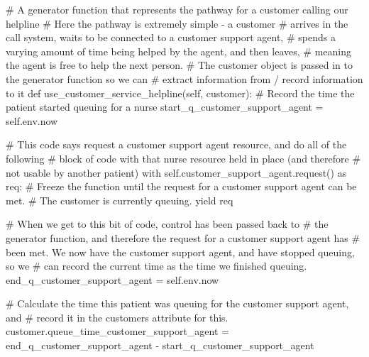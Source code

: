 \documentclass[
  letterpaper,
  DIV=11,
  numbers=noendperiod]{scrreprt}
\newenvironment{Shaded}{\begin{snugshade}}{\end{snugshade}}
\newcommand{\CommentTok}[1]{\textcolor[rgb]{0.37,0.37,0.37}{#1}}
\newcommand{\ControlFlowTok}[1]{\textcolor[rgb]{0.00,0.23,0.31}{#1}}
\newcommand{\ImportTok}[1]{\textcolor[rgb]{0.00,0.46,0.62}{#1}}
\newcommand{\KeywordTok}[1]{\textcolor[rgb]{0.00,0.23,0.31}{#1}}
\newcommand{\NormalTok}[1]{\textcolor[rgb]{0.00,0.23,0.31}{#1}}
\newcommand{\OperatorTok}[1]{\textcolor[rgb]{0.37,0.37,0.37}{#1}}
\newcommand{\VariableTok}[1]{\textcolor[rgb]{0.07,0.07,0.07}{#1}}
\begin{document}
\begin{tcolorbox}
\begin{Shaded}
\begin{Highlighting}[]
    \CommentTok{\# A generator function that represents the pathway for a customer calling our helpline}
    \CommentTok{\# Here the pathway is extremely simple {-} a customer}
    \CommentTok{\# arrives in the call system, waits to be connected to a customer support agent,}
    \CommentTok{\# spends a varying amount of time being helped by the agent, and then leaves,}
    \CommentTok{\# meaning the agent is free to help the next person.}
    \CommentTok{\# The customer object is passed in to the generator function so we can}
    \CommentTok{\# extract information from / record information to it}
    \KeywordTok{def}\NormalTok{ use\_customer\_service\_helpline(}\VariableTok{self}\NormalTok{, customer):}
        \CommentTok{\# Record the time the patient started queuing for a nurse}
\NormalTok{        start\_q\_customer\_support\_agent }\OperatorTok{=} \VariableTok{self}\NormalTok{.env.now}

        \CommentTok{\# This code says request a customer support agent resource, and do all of the following}
        \CommentTok{\# block of code with that nurse resource held in place (and therefore}
        \CommentTok{\# not usable by another patient)}
        \ControlFlowTok{with} \VariableTok{self}\NormalTok{.customer\_support\_agent.request() }\ImportTok{as}\NormalTok{ req:}
            \CommentTok{\# Freeze the function until the request for a customer support agent can be met.}
            \CommentTok{\# The customer is currently queuing.}
            \ControlFlowTok{yield}\NormalTok{ req}

            \CommentTok{\# When we get to this bit of code, control has been passed back to}
            \CommentTok{\# the generator function, and therefore the request for a customer support agent has}
            \CommentTok{\# been met.  We now have the customer support agent, and have stopped queuing, so we}
            \CommentTok{\# can record the current time as the time we finished queuing.}
\NormalTok{            end\_q\_customer\_support\_agent }\OperatorTok{=} \VariableTok{self}\NormalTok{.env.now}

            \CommentTok{\# Calculate the time this patient was queuing for the customer support agent, and}
            \CommentTok{\# record it in the customer\textquotesingle{}s attribute for this.}
\NormalTok{            customer.queue\_time\_customer\_support\_agent }\OperatorTok{=}\NormalTok{ end\_q\_customer\_support\_agent }\OperatorTok{{-}}\NormalTok{ start\_q\_customer\_support\_agent}


\end{Highlighting}
\end{Shaded}
\end{tcolorbox}
\end{document}
